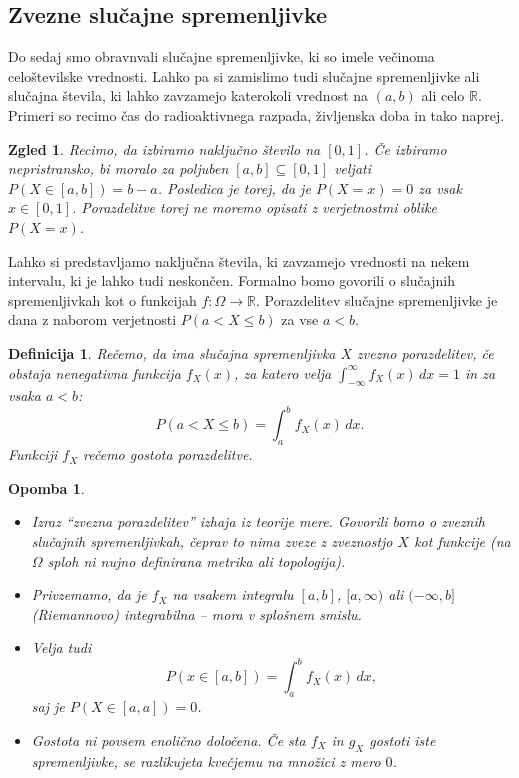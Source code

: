 \documentclass[10pt, a4paper]{article}
\newtheorem{defi}[izr]{Definicija}
\newenvironment{noticeB}{%
  \tcolorbox[%
  notitle,
  empty,
  enhanced,  %
  breakable,
  coltext=black,
  colback=white, 
  fontupper=\rmfamily,
  parbox=false,
  noparskip,
  sharp corners,
  boxrule=-1pt,  %
  frame hidden,
  left=7pt,  %
  right=7pt,
  top=5pt,
  bottom=5pt,
  before skip=2.5ex plus 2pt,
  after skip=2.5ex plus 2pt,
  borderline west = {1.5pt}{-0.1pt}{blue!30!black}, %
  overlay unbroken and last={%
    \draw[color=black, line width=1.25pt]
    ($(frame.south west)+(1.pt, -0.1pt)$) -- ++(2em, 0);
  }
  ]}
{\endtcolorbox}
\newenvironment{definicija}{\begin{defi}\begin{noticeB}}{%
    \end{noticeB}\end{defi}}
\newtheorem*{opomba}{Opomba}
\newtheorem{zgled}[izr]{Zgled}
\newcommand{\R}{\mathbb {R}}
\begin{document}
\subsection{Zvezne slučajne spremenljivke}

Do sedaj smo obravnvali slučajne spremenljivke, ki so imele večinoma 
celoštevilske vrednosti. Lahko pa si zamislimo tudi 
slučajne spremenljivke ali slučajna števila, ki lahko zavzamejo katerokoli vrednost 
na $(a, b)$ ali celo $\R$.
Primeri so recimo čas do radioaktivnega razpada, življenska doba in tako naprej.

\begin{zgled}
  Recimo, da izbiramo naključno število na $[0, 1]$.
  Če izbiramo nepristransko, bi moralo za poljuben $[a, b] \subseteq [0, 1]$ veljati
  $P(X \in [a, b]) = b - a$. 
  Posledica je torej, da je $P(X = x) = 0$
  za vsak $x \in [0, 1]$.
  Porazdelitve torej ne moremo opisati z verjetnostmi 
  oblike $P(X = x)$.  
\end{zgled}

Lahko si predstavljamo naključna števila, ki zavzamejo vrednosti na 
nekem intervalu, ki je lahko tudi neskončen.
Formalno bomo govorili o slučajnih spremenljivkah kot o funkcijah 
$f: \Omega \to \R$. Porazdelitev slučajne spremenljivke je dana z naborom verjetnosti 
$P(a < X \leq b)$ za vse $a < b$.

\begin{definicija}
  Rečemo, da ima slučajna spremenljivka $X$ zvezno porazdelitev,
  če obstaja nenegativna funkcija $f_X (x)$, za katero velja $\int_{-\infty} ^\infty f_X(x)\, dx = 1$
  in za vsaka $a < b$:
  $$P(a < X \leq b) = \int_a ^b f_X (x)\, dx.$$
  Funkciji $f_X$ rečemo gostota porazdelitve.
\end{definicija}

\begin{opomba}
  \begin{itemize}
    \item Izraz "`zvezna porazdelitev"' izhaja iz teorije mere.
    Govorili bomo o zveznih slučajnih spremenljivkah, čeprav to nima zveze z 
    zveznostjo $X$ kot funkcije (na $\Omega$ sploh ni nujno definirana metrika ali topologija).
    \item Privzemamo, da je $f_X$ na vsakem integralu $[a, b]$, $[a, \infty)$ ali $(-\infty, b]$
    (Riemannovo) integrabilna -- mora v splošnem smislu.
    \item Velja tudi $$P(x \in [a, b]) = \int_a ^b f_X (x)\, dx,$$
    saj je $P(X \in [a, a]) = 0$.
    \item Gostota ni povsem enolično določena. Če sta $f_X$ in $g_X$
    gostoti iste spremenljivke, se razlikujeta kvečjemu na množici z mero $0$.
  \end{itemize}
\end{opomba}
\end{document}
